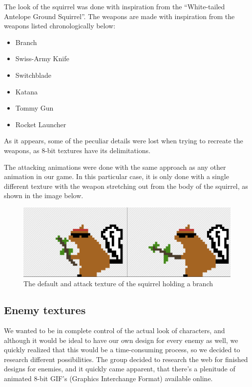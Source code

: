 \documentclass[12p]{article}
\begin{document}
\newpage 
The look of the squirrel was done with inspiration from the “White-tailed Antelope Ground Squirrel”. The weapons are made with inspiration from the weapons listed chronologically below:

\begin{itemize}
    \item Branch
    \item Swiss-Army Knife
    \item Switchblade
    \item Katana
    \item Tommy Gun
    \item Rocket Launcher
\end{itemize}

As it appears, some of the peculiar details were lost when trying to recreate the weapons, as 8-bit textures have its delimitations. 

The attacking animations were done with the same approach as any other animation in our game. In this particular case, it is only done with a single different texture with the weapon stretching out from the body of the squirrel, as shown in the image below.

\begin{figure}[ht]
  \center
  \includegraphics[width=1\textwidth]{Documentation/Picture2.png}
  \caption{The default and attack texture of the squirrel holding a branch}
  \label{fig:squirrel_branch_default_attack_texture}
\end{figure}

\newpage 
\subsection{Enemy textures}

We wanted to be in complete control of the actual look of characters, and although it would be ideal to have our own design for every enemy as well, we quickly realized that this would be a time-consuming process, so we decided to research different possibilities. The group decided to research the web for finished designs for enemies, and it quickly came apparent, that there’s a plenitude of animated 8-bit GIF’s (Graphics Interchange Format) available online. 
\end{document}
